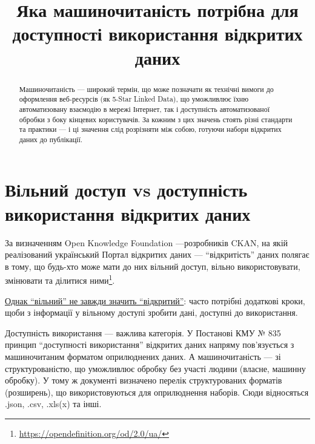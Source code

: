 \documentclass[
]{agujournal2019}
\begin{document}
\title{Яка машиночитаність потрібна для доступності використання
відкритих даних}



\begin{abstract}
Машиночитаність --- широкий термін, що може позначати як технічні вимоги
до оформлення веб-ресурсів (як 5-Star Linked Data), що уможливлює їхню
автоматизовану взаємодію в мережі Інтернет, так і доступність
автоматизованої обробки з боку кінцевих користувачів. За кожним з цих
значень стоять різні стандарти та практики --- і ці значення слід
розрізняти між собою, готуючи набори відкритих даних до публікації.
\end{abstract}





\section{Вільний доступ vs доступність використання відкритих
даних}\label{ux432ux456ux43bux44cux43dux438ux439-ux434ux43eux441ux442ux443ux43f-vs-ux434ux43eux441ux442ux443ux43fux43dux456ux441ux442ux44c-ux432ux438ux43aux43eux440ux438ux441ux442ux430ux43dux43dux44f-ux432ux456ux434ux43aux440ux438ux442ux438ux445-ux434ux430ux43dux438ux445}

За визначенням Open Knowledge Foundation ---розробників CKAN, на якій
реалізований український Портал відкритих даних --- ``відкритість''
даних полягає в тому, що будь-хто може мати до них вільний доступ,
вільно використовувати, змінювати та ділитися ними\footnote{\url{https://opendefinition.org/od/2.0/ua/}}.

\href{https://aims.gitbook.io/open-data-mooc/unit-1-open-data-principles/lesson-1.1-what-is-open-data\#id-5.-challenges}{Однак
``вільний'' не завжди значить ``відкритий''}: часто потрібні додаткові
кроки, щоби з інформації у вільному доступі зробити дані, доступні до
використання.

Доступність використання --- важлива категорія. У Постанові КМУ № 835
принцип ``доступності використання'' відкритих даних напряму
пов'язується з машиночитаним форматом оприлюднених даних. А
машиночитаність --- зі структурованістю, що уможливлює обробку без
участі людини (власне, машинну обробку). У тому ж документі визначено
перелік структурованих форматів (розширень), що використовуються для
оприлюднення наборів. Сюди відносяться .json, .csv, .xls(x) та інші.
\end{document}
